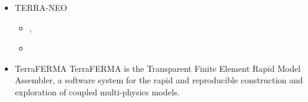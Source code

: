 \begin{itemize}
\begin{scriptsize}
\begin{itemize}
                             \textcite{scbs09},  \textcite{scbs09b},
                             \textcite{scbr09},  \textcite{oebm09},
                             \textcite{dada09}
\item[\twothousandten]       \textcite{yayh10}
\item[\twothousandeleven]    \textcite{woda11},  \textcite{iahb11}
\item[\twothousandtwelve]    \textcite{dagd12},  \textcite{shbs12}
\item[\twothousandthirteen]  \textcite{dadb13},  \textcite{oflb13}
\item[\twothousandfourteen]  \textcite{butm14}
\item[\twothousandfifteen]   \textcite{amsb15},  \textcite{cobs15}
\item[\twothousandsixteen]   \textcite{vade16},  \textcite{necg16}, \textcite{pric16}
\item[\twothousandseventeen] \textcite{woda17},  \textcite{badw17}, \textcite{rubh17} 
\item[\twothousandeighteen]  \textcite{ghbu18},  \textcite{cogb18}, \textcite{prda18}
\item[\twothousandnineteen]  \textcite{prdp19}
\item[\twothousandtwenty]    \textcite{cobo20}
\item[\twothousandtwentyone] \textcite{ghbo21}
\item[\twothousandtwentytwo] \textcite{licw22},  \textcite{brcb22}
\end{itemize}
\end{scriptsize}

\item {\codefont TERRA-NEO} 

\begin{scriptsize}
\begin{itemize}
\item[\twothousandfifteen] \textcite{gmrs15}, \textcite{wegg15}
\item[\twothousandtwenty]  \textcite{babd20}
\end{itemize}
\end{scriptsize}

\item {\codefont TerraFERMA} 
TerraFERMA is the Transparent Finite Element Rapid Model Assembler, a software 
system for the rapid and reproducible construction and exploration of coupled multi-physics models.


\end{itemize}
